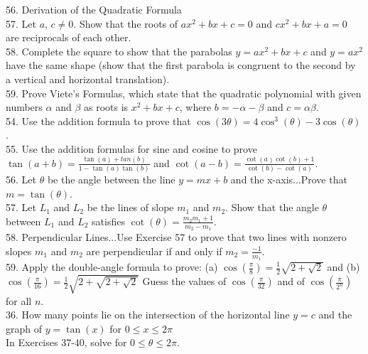 \documentclass{article}
\begin{document}
56.  Derivation of the Quadratic Formula\\

57. Let $a$, $c \neq 0$. Show that the roots of $ax^2 + bx + c = 0$ and $cx^2 + bx + a = 0$ are reciprocals of each other.\\

58. Complete the square to show that the parabolas $y = ax^2 + bx + c$ and $y = ax^2$ have the same shape (show that the first parabola is congruent to the second by a vertical and horizontal translation).\\

59. Prove Viete's Formulas, which state that the quadratic polynomial with given numbers $\alpha$ and $\beta$ as roots is $x^2 + bx + c$, where $b = -\alpha - \beta$ and $c = \alpha\beta$.\\

54. Use the addition formula to prove that $\cos(3\theta)= 4\cos^3(\theta) - 3\cos(\theta)$.\\

55. Use the addition formulas for sine and cosine to prove $\tan(a + b) = \frac{\tan(a) + tan(b)}{1 - \tan(a)\tan(b)}$ and $\cot(a - b) = \frac{\cot(a)\cot(b) + 1}{\cot(b) - \cot(a)}$.\\

56. Let $\theta$ be the angle between the line $y = mx + b$ and the x-axis...Prove that $m = \tan(\theta)$.\\

57. Let $L_1$ and $L_2$ be the lines of slope $m_1$ and $m_2$. Show that the angle $\theta$ between $L_1$ and $L_2$ satisfies $\cot(\theta) = \frac{m_2m_1 + 1}{m_2 - m_1}$.\\

58. Perpendicular Lines...Use Exercise 57 to prove that two lines with nonzero slopes $m_1$ and $m_2$ are perpendicular if and only if $m_2 = \frac{-1}{m_1}$.\\

59. Apply the double-angle formula to prove: (a) $\cos(\frac{\pi}{8}) = \frac{1}{2}\sqrt{2 + \sqrt{2}}$ and (b) $\cos(\frac{\pi}{16}) = \frac{1}{2}\sqrt{2 + \sqrt{2 + \sqrt{2}}}$ Guess the values of $\cos(\frac{\pi}{32})$ and of $\cos(\frac{\pi}{2^n})$ for all $n$.\\

36. How many points lie on the intersection of the horizontal line $y = c$ and the graph of $y = \tan(x)$ for $0 \leq x \leq 2\pi$\\

In Exercises 37-40, solve for $0 \leq \theta \leq 2\pi$.\\
\end{document}
